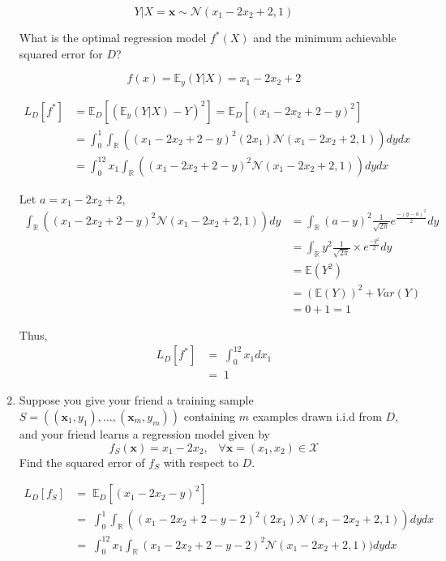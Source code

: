 \begin{enumerate}
	$$Y|X = \mathbf{x} \sim \mathcal{N}(x_1 - 2x_2 +2,1)$$ 
	
	What is the optimal regression model $f^*(X)$ and the minimum achievable squared error for $D$?
	
	$$ f(x) = \mathbb{E}_y(Y|X) = x_1-2x_2+2 $$
	
	\begin{align*}
		L_D[f^*] &= \mathbb{E}_D[(\mathbb{E}_y(Y|X)-Y)^2] = \mathbb{E}_D[(x_1-2x_2+2-y)^2]\\
		&= \int_0^1 \int_\mathbb{R}((x_1-2x_2+2-y)^2(2x_1)\mathcal{N}(x_1-2x_2+2,1))dydx\\
		&= \int_0^12x_1 \int_\mathbb{R}((x_1-2x_2+2-y)^2\mathcal{N}(x_1-2x_2+2,1))dydx
	\end{align*}
	
	Let $a=x_1 - 2 x_2 + 2$,
	\begin{align*}
		\int_\mathbb{R}^{} ((x_1-2x_2+2-y)^2 \mathcal{N}(x_1-2x_2+2,1))dy &= 
		\int_\mathbb{R}^{} (a-y)^2 \frac{1}{\sqrt{2\pi}} e^{\frac{- \left({y - a } \right)^2 } { 
2}} dy\\
		&=\int_\mathbb{R}y^2\frac{1}{\sqrt {2\pi }} \times e^{ \frac{-y^2}{2} } dy\\
		&= \mathbb{E} (Y^2)\\
		&= (\mathbb{E} (Y))^2+Var(Y)\\
		&= 0+1 =1
	\end{align*}
	
	Thus,
	\begin{align*}
		L_D[f^*]&=\; 
		\int_0^12x_1dx_1\\
		&=\; 1
	\end{align*}
	
	\item 
	Suppose you give your friend a training sample $S = ((\mathbf{x}_1,y_1),...,(\mathbf{x}_m,y_m))$ containing $m$ examples drawn i.i.d from $D$, and your friend learns a regression model given by 
	$$f_S(\mathbf{x}) = x_1 - 2x_2, \; \; \; \forall \mathbf{x} = (x_1,x_2) \in \mathcal{X}$$
	Find the squared error of $f_S$ with respect to $D$. 
	
	\begin{align*}
		L_D[f_S] &=\; \mathbb{E}_D[(x_1-2x_2-y)^2]\\
		&=\; \int_0^1 \int_\mathbb{R}((x_1-2x_2+2-y-2)^2(2x_1)\mathcal{N}(x_1-2x_2+2,1))dydx\\
		&=\; \int_0^12x_1 \int_\mathbb{R}(x_1-2x_2+2-y-2)^2\mathcal{N}(x_1-2x_2+2,1))dydx\\
	\end{align*}
	

\end{enumerate}
